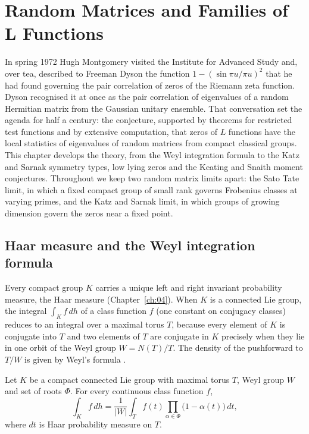 \chapter{Random Matrices and Families of L Functions}\label{ch:06}

In spring 1972 Hugh Montgomery visited the Institute for Advanced Study and, over tea, described to Freeman Dyson the function $1-(\sin\pi u/\pi u)^2$ that he had found governing the pair correlation of zeros of the Riemann zeta function. Dyson recognised it at once as the pair correlation of eigenvalues of a random Hermitian matrix from the Gaussian unitary ensemble. That conversation set the agenda for half a century: the conjecture, supported by theorems for restricted test functions and by extensive computation, that zeros of $L$ functions have the local statistics of eigenvalues of random matrices from compact classical groups. This chapter develops the theory, from the Weyl integration formula to the Katz and Sarnak symmetry types, low lying zeros and the Keating and Snaith moment conjectures. Throughout we keep two random matrix limits apart: the Sato Tate limit, in which a fixed compact group of small rank governs Frobenius classes at varying primes, and the Katz and Sarnak limit, in which groups of growing dimension govern the zeros near a fixed point.

\section{Haar measure and the Weyl integration formula}\label{sec:ch6weyl}

Every compact group $K$ carries a unique left and right invariant probability measure, the Haar measure (Chapter~\ref{ch:04}). When $K$ is a connected Lie group, the integral $\int_Kf\,dh$ of a class function $f$ (one constant on conjugacy classes) reduces to an integral over a maximal torus $T$, because every element of $K$ is conjugate into $T$ and two elements of $T$ are conjugate in $K$ precisely when they lie in one orbit of the Weyl group $W=N(T)/T$. The density of the pushforward to $T/W$ is given by Weyl's formula \cite{weyl1925}.

\begin{theorem}\label{thm:ch6weyl}
Let $K$ be a compact connected Lie group with maximal torus $T$, Weyl group $W$ and set of roots $\Phi$. For every continuous class function $f$,
\[
\int_Kf\,dh=\frac{1}{|W|}\int_Tf(t)\prod_{\alpha\in\Phi}\bigl(1-\alpha(t)\bigr)\,dt ,
\]
where $dt$ is Haar probability measure on $T$.
\end{theorem}

